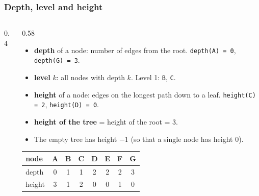 \documentclass[aspectratio=169,10pt,compress]{beamer}
\begin{document}
\begin{frame}[t,fragile] \frametitle{Depth, level and height}
  \begin{columns}[T]
    \begin{column}{0.4\textwidth}
      \begin{center}
      \end{center}
    \end{column}
    \begin{column}{0.58\textwidth}
      \begin{itemize}\small
        \item \textbf{depth} of a node: number of edges from the root. \texttt{depth(A) = 0}, \texttt{depth(G) = 3}.
        \item \textbf{level} $k$: all nodes with depth $k$. Level 1: \texttt{B}, \texttt{C}.
        \item \textbf{height} of a node: edges on the longest path down to a leaf. \texttt{height(C) = 2}, \texttt{height(D) = 0}.
        \item \textbf{height of the tree} = height of the root = 3.
        \item The empty tree has height $-1$ (so that a single node has height 0).
      \end{itemize}
      \begin{center}\small
      \begin{tabular}{lccccccc}
        \toprule
        node   & A & B & C & D & E & F & G \\
        \midrule
        depth  & 0 & 1 & 1 & 2 & 2 & 2 & 3 \\
        height & 3 & 1 & 2 & 0 & 0 & 1 & 0 \\
        \bottomrule
      \end{tabular}
      \end{center}
    \end{column}
  \end{columns}
\end{frame}
\end{document}
